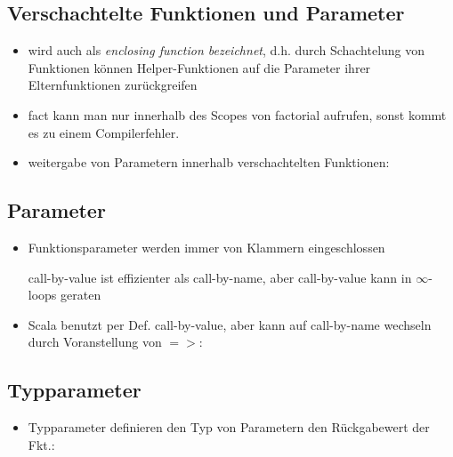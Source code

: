 \subsection{Verschachtelte Funktionen und Parameter}
\begin{itemize}
  \item wird auch als \textit{enclosing function bezeichnet}, d.h. durch
  Schachtelung von Funktionen können Helper-Funktionen auf die Parameter ihrer
  Elternfunktionen zurückgreifen
  \item 
  
  fact kann man nur innerhalb des Scopes von factorial aufrufen, sonst kommt
  es zu einem Compilerfehler.
  
  \item weitergabe von Parametern innerhalb verschachtelten Funktionen:
  
    

\end{itemize}


\subsection{Parameter}
\begin{itemize}
  \item Funktionsparameter werden immer von Klammern eingeschlossen
  
  
  call-by-value ist effizienter als call-by-name, aber call-by-value
  kann in $\infty$-loops geraten
    
  \item Scala benutzt per Def. call-by-value, aber kann auf call-by-name
  wechseln durch Voranstellung von $=>$:
  
  
  
\end{itemize}


\subsection{Typparameter}
\begin{itemize}
  \item Typparameter definieren den Typ von Parametern \oder den
  Rückgabewert der Fkt.:

  
\end{itemize}
  

